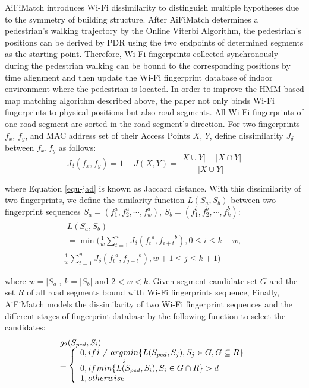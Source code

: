 \documentclass[conference]{IEEEtran}
\begin{document}
AiFiMatch introduces Wi-Fi dissimilarity to distinguish multiple hypotheses due to the symmetry of building structure. After AiFiMatch determines a pedestrian's walking trajectory by the Online Viterbi Algorithm, the pedestrian's positions can be derived by PDR using the two endpoints of determined segments as the starting point. Therefore, Wi-Fi fingerprints collected synchronously during the pedestrian walking can be bound to the corresponding positions by time alignment and then update the Wi-Fi fingerprint database of indoor environment where the pedestrian is located. In order to improve the HMM based map matching algorithm described above, the paper not only binds Wi-Fi fingerprints to physical positions but also road segments. All Wi-Fi fingerprints of one road segment are sorted in the road segment's direction. For two fingerprints $f_x$, $f_y$, and MAC address set of their Access Points $X$, $Y$, define dissimilarity $J_{\delta}$ between $f_x,f_y$ as follows:
\begin{equation}
{J_\delta }(f_x,f_y) = 1 - J(X,Y) = \frac{{|X \cup Y| - |X \cap Y|}}{{|X \cup Y|}}
\label{equ-jad}
\end{equation}

where Equation \ref{equ-jad} is known as Jaccard distance. With this dissimilarity of two fingerprints, we define the similarity function $L(S_a, S_b)$ between two fingerprint sequences $S_a = (f_1^a,f_2^a,\cdots,f_w^a)$, $S_b = (f_1^b, f_2^b, \cdots, f_k^b)$:
\begin{equation}
\begin{array}{*{20}{c}}
\begin{array}{l}
L({S_a},{S_b})\\
= \min (\frac{1}{w}\sum\limits_{t = 1}^w {{J_\delta }({f_t}^a,{f_{i + t}}^b),0 \le i \le k - w,} 
\end{array}\\
{\frac{1}{w}\sum\limits_{t = 1}^w {{J_\delta }({f_t}^a,{f_{j - t}}^b),w + 1 \le j \le k + 1} )}
\end{array}
\end{equation}

where $w=|S_a|$, $k=|S_b|$ and $2<w<k$. Given segment candidate set $G$ and the set $R$ of all road segments bound with Wi-Fi fingerprints sequence, Finally, AiFiMatch models the dissimilarity of two Wi-Fi fingerprint sequences and the different stages of fingerprint database by the following function to select the candidates: 
\begin{equation}
\begin{array}{l}
{g_2}({S_{ped}},{S_i})\\
= \left\{ {\begin{array}{*{20}{l}}
	{0,if{\kern 1pt} i \ne \mathop {argmin}\limits_j \{ L({S_{ped}},{S_j}),{S_j} \in G,G \subseteq R\} }\\
	{0,if{\kern 1pt} min\{ L({S_{ped}},{S_i}),{S_i} \in G \cap R\}  > d}\\
	{1,otherwise}
	\end{array}} \right.
\end{array}
\end{equation}
\end{document}
